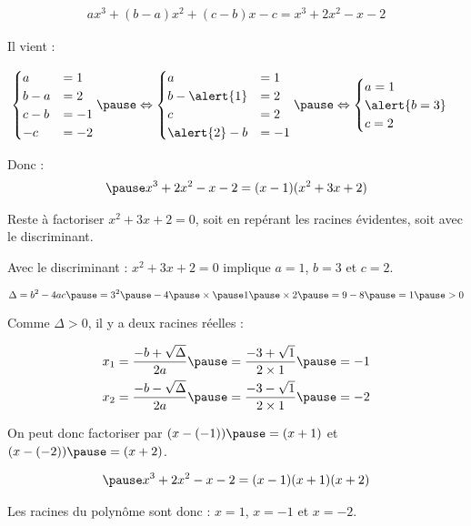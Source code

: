 \documentclass[9pt,professionalfonts,handout,hyperref]{beamer}
\begin{document}
\begin{frame}

\[\begin{aligned}
ax^3+(b-a)x^2+(c-b)x -c = x^3+2x^2-x-2
\end{aligned}\]

\bigskip

Il vient :

\[\begin{aligned}
\begin{cases}
	a   & = 1 \\
	b-a & = 2 \\
	c-b & =-1 \\
	-c  & =-2
\end{cases}
\pause \Leftrightarrow
\begin{cases}
	a           & = 1 \\
	b-\alert{1} & = 2 \\
	c           & =2  \\
	\alert{2}-b & =-1
\end{cases}
\pause \Leftrightarrow
\begin{cases}
	a= 1         \\
	\alert{b= 3} \\
	c =2
\end{cases}
\end{aligned}\]

\bigskip
\pause Donc :
\[\begin{aligned}
\pause x^3+2x^2-x-2 = (x-1)(x^2+3x+2)
\end{aligned}\]

\bigskip

\pause Reste à factoriser $x^2+3x+2 = 0$, soit en repérant les racines évidentes, soit avec le discriminant.
\end{frame}

\begin{frame}

Avec le discriminant : $x^2+3x+2 = 0$ implique \pause $a=1$, \pause $b=3$ et \pause $c=2$.

\[
\Delta = b^2 -4ac \pause = 3^2 \pause - 4 \pause \times \pause 1 \pause \times 2 \pause = 9-8 \pause = 1 \pause >0
\]


\pause Comme $\Delta>0$, il y a deux racines réelles :

\[\begin{aligned}
&x_1 = \frac{-b + \sqrt{\Delta}}{2a} \pause = \frac{-3 + \sqrt{1}}{2\times1} \pause = -1\\
&x_2 = \frac{-b - \sqrt{\Delta}}{2a} \pause = \frac{-3 - \sqrt{1}}{2\times1} \pause = -2\\
\end{aligned}\]

\pause On peut donc factoriser par \pause $(x-(-1)) \pause = (x+1)$ \pause et $(x-(-2)) \pause = (x+2)$.

\[\begin{aligned}
\pause x^3+2x^2-x-2 = (x-1)(x+1)(x+2)
\end{aligned}\]

\bigskip
\pause Les racines du polynôme sont donc : $x=1$, $x=-1$ et $x=-2$.

\end{frame}
\end{document}
